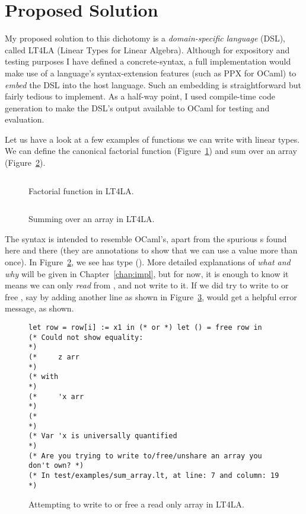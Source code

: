 \section{Proposed Solution}

My proposed solution to this dichotomy is a \emph{domain-specific language}
(DSL), called LT4LA (Linear Types for Linear Algebra). Although for expository
and testing purposes I have defined a concrete-syntax, a full implementation
would make use of a language's syntax-extension features (such as PPX for
OCaml) to \emph{embed} the DSL into the host language. Such an embedding is
straightforward but fairly tedious to implement. As a half-way point, I used
compile-time code generation to make the DSL's output available to OCaml for
testing and evaluation.

Let us have a look at a few examples of functions we can write with linear
types.  We can define the canonical factorial function
(Figure~\ref{fig:ltfla_factorial}) and sum over an array
(Figure~\ref{fig:ltfla_sumarray}).

\begin{figure}[tp]
    \inputminted[linenos, fontsize=\small]{ocaml}{../test/examples/factorial.lt}
    \caption{Factorial function in LT4LA.}\label{fig:ltfla_factorial}
\end{figure}

\begin{figure}[tp]
    \inputminted[linenos, fontsize=\small]{ocaml}{../test/examples/sum_array.lt}
    \caption{Summing over an array in LT4LA.}\label{fig:ltfla_sumarray}
\end{figure}

The syntax is intended to resemble OCaml's, apart from the spurious
s found here and there (they are annotations to show that we can
use a value more than once). In Figure~\ref{fig:ltfla_sumarray}, we see
 has type (). More detailed explanations of
\emph{what and why} will be given in Chapter~\ref{chap:impl}, but for now, it
is enough to know it means we can only \emph{read} from , and not
write to it. If we did try to write to or free , say by adding
another line as shown in Figure~\ref{fig:ltfla_univ}, would get a helpful error
message, as shown.

\begin{figure}[tp]
    \begin{verbatim}
let row = row[i] := x1 in (* or *) let () = free row in
(* Could not show equality:                                        *)
(*     z arr                                                       *)
(* with                                                            *)
(*     'x arr                                                      *)
(*                                                                 *)
(* Var 'x is universally quantified                                *)
(* Are you trying to write to/free/unshare an array you don't own? *)
(* In test/examples/sum_array.lt, at line: 7 and column: 19        *)
    \end{verbatim}
    \caption{Attempting to write to or free a read only array in
    LT4LA.}\label{fig:ltfla_univ}
\end{figure}

